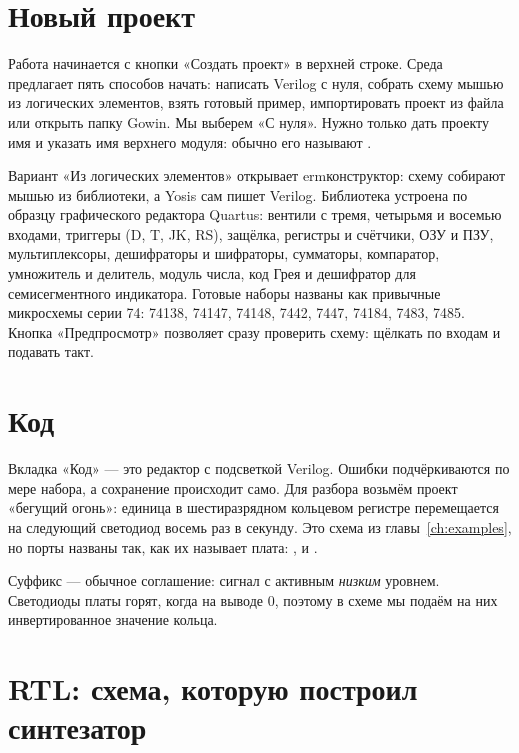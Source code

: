 \section{Новый проект}

Работа начинается с кнопки «Создать проект» в верхней строке. Среда
предлагает пять способов начать: написать Verilog с нуля, собрать схему
мышью из логических элементов, взять готовый пример, импортировать проект из
файла или открыть папку Gowin. Мы выберем «С нуля». Нужно только дать проекту
имя и указать имя верхнего модуля: обычно его называют .


Вариант «Из логических элементов» открывает 	erm{конструктор}: схему собирают
мышью из библиотеки, а Yosis сам пишет Verilog. Библиотека устроена по образцу
графического редактора Quartus: вентили с тремя, четырьмя и восемью входами,
триггеры (D, T, JK, RS), защёлка, регистры и счётчики, ОЗУ и ПЗУ,
мультиплексоры, дешифраторы и шифраторы, сумматоры, компаратор, умножитель и
делитель, модуль числа, код Грея и дешифратор для семисегментного индикатора.
Готовые наборы названы как привычные микросхемы серии 74: 74138, 74147, 74148, 7442, 7447, 74184, 7483,
7485. Кнопка «Предпросмотр» позволяет сразу проверить схему: щёлкать по входам
и подавать такт.

\section{Код}

Вкладка «Код» --- это редактор с подсветкой Verilog. Ошибки подчёркиваются
по мере набора, а сохранение происходит само. Для разбора возьмём проект
«бегущий огонь»: единица в шестиразрядном кольцевом регистре перемещается на
следующий светодиод восемь раз в секунду. Это схема из главы~\ref{ch:examples},
но порты названы так, как их называет плата: ,  и
.


\begin{infobox}
Суффикс  --- обычное соглашение: сигнал с активным \emph{низким}
уровнем. Светодиоды платы горят, когда на выводе 0, поэтому в схеме мы
подаём на них инвертированное значение кольца.
\end{infobox}

\section{RTL: схема, которую построил синтезатор}

